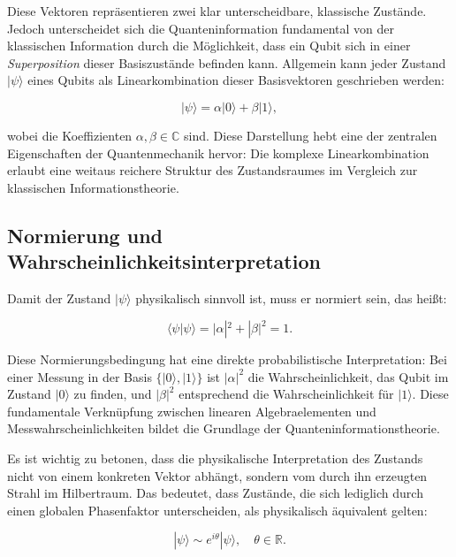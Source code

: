 Diese Vektoren repräsentieren zwei klar unterscheidbare, klassische Zustände. Jedoch unterscheidet sich die Quanteninformation fundamental von der klassischen Information durch die Möglichkeit, dass ein Qubit sich in einer \textit{Superposition} dieser Basiszustände befinden kann. Allgemein kann jeder Zustand $|\psi\rangle$ eines Qubits als Linearkombination dieser Basisvektoren geschrieben werden:

\begin{equation}
|\psi\rangle = \alpha |0\rangle + \beta |1\rangle,
\end{equation}

wobei die Koeffizienten $\alpha, \beta \in \mathbb{C}$ sind. Diese Darstellung hebt eine der zentralen Eigenschaften der Quantenmechanik hervor: Die komplexe Linearkombination erlaubt eine weitaus reichere Struktur des Zustandsraumes im Vergleich zur klassischen Informationstheorie.

\vspace{0.5em}
\subsection*{Normierung und Wahrscheinlichkeitsinterpretation}

Damit der Zustand $|\psi\rangle$ physikalisch sinnvoll ist, muss er normiert sein, das heißt:

\begin{equation}
\langle \psi | \psi \rangle = |\alpha|^2 + |\beta|^2 = 1.
\end{equation}

Diese Normierungsbedingung hat eine direkte probabilistische Interpretation: Bei einer Messung in der Basis $\{ |0\rangle, |1\rangle \}$ ist $|\alpha|^2$ die Wahrscheinlichkeit, das Qubit im Zustand $|0\rangle$ zu finden, und $|\beta|^2$ entsprechend die Wahrscheinlichkeit für $|1\rangle$. Diese fundamentale Verknüpfung zwischen linearen Algebraelementen und Messwahrscheinlichkeiten bildet die Grundlage der Quanteninformationstheorie.

Es ist wichtig zu betonen, dass die physikalische Interpretation des Zustands nicht von einem konkreten Vektor abhängt, sondern vom durch ihn erzeugten Strahl im Hilbertraum. Das bedeutet, dass Zustände, die sich lediglich durch einen globalen Phasenfaktor unterscheiden, als physikalisch äquivalent gelten:

\begin{equation}
|\psi\rangle \sim e^{i\theta}|\psi\rangle, \quad \theta \in \mathbb{R}.
\end{equation}




